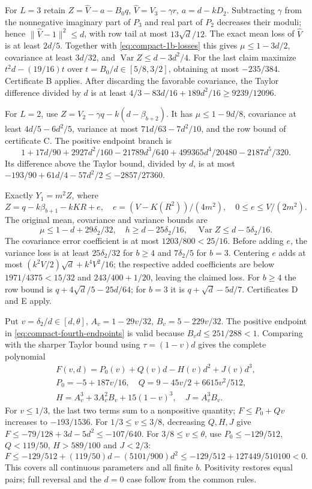 For $L=3$ retain $Z=\widehat V-a-B_0q$,
$\widehat V=V_3-\gamma r$, $a=d-kD_2$.
Subtracting $\gamma$ from the nonnegative imaginary part of $P_3$
and real part of $P_2$ decreases their moduli; hence
$\|\widehat V-1\|^2\le d$, with row tail at most $13\sqrt d/12$.
The exact mean loss of $\widehat V$ is at least $2d/5$.
Together with \eqref{eq:compact-1b-losses} this gives
$\mu\le1-3d/2$, covariance at least $3d/32$, and
$\operatorname{Var}Z\le d-3d^2/4$.
For the last claim maximize $t^2d-(19/16)t$ over
$t=B_0/d\in[5/8,3/2]$, obtaining at most $-235/384$.
Certificate B applies. After discarding the favorable covariance,
the Taylor difference divided by $d$ is at least
$4/3-83d/16+189d^2/16\ge9239/12096$.

For $L=2$, use $Z=V_2-\gamma q-k(d-\beta_{b+2})$.
It has $\mu\le1-9d/8$, covariance at least $4d/5-6d^2/5$,
variance at most $71d/63-7d^2/10$, and the row bound of certificate C.
The positive endpoint branch is
\[
 1+17d/90+2927d^2/160-21789d^3/640
                  +499365d^4/20480-2187d^5/320.
\]
Its difference above the Taylor bound, divided by $d$, is at most
$-193/90+61d/4-57d^2/2\le-2857/27360$.

Exactly $Y_1=m^2Z$, where
\[
 Z=q-k\beta_{b+1}-kKR+e,\quad
 e=(V-K(R^2))/(4m^2),\quad0\le e\le V/(2m^2).
\]
The original mean, covariance and variance bounds are
\[
 \mu\le1-d+29\delta_{2}/32,\quad h\ge d-25\delta_{2}/16,\quad
 \operatorname{Var}Z\le d-5\delta_{2}/16.
\]
The covariance error coefficient is at most $1203/800<25/16$.
Before adding $e$, the variance loss is at least $25\delta_{2}/32$ for
$b\ge4$ and $7\delta_{2}/5$ for $b=3$.
Centering $e$ adds at most $(k^2V/2)\sqrt d+k^4V^2/16$;
the respective added coefficients are below $1971/4375<15/32$ and
$243/400+1/20$, leaving the claimed loss.
For $b\ge4$ the row bound is $q+4\sqrt d/5-25d/64$;
for $b=3$ it is $q+\sqrt d-5d/7$. Certificates D and E apply.

Put $v=\delta_{2}/d\in[d,\theta]$,
$A_v=1-29v/32$, $B_v=5-229v/32$.
The positive endpoint in \eqref{eq:compact-fourth-endpoints} is valid
because $B_vd\le251/288<1$. Comparing with the sharper Taylor bound
using $\tau=(1-v)d$ gives the complete polynomial
\begin{gather*}
 F(v,d)=P_0(v)+Q(v)d-H(v)d^2+J(v)d^3,\\
 P_0=-5+187v/16,\quad Q=9-45v/2+6615v^2/512,\\
 H=A_v^3+3A_v^2B_v+15(1-v)^3,\quad J=A_v^3B_v.
\end{gather*}
For $v\le1/3$, the last two terms sum to a nonpositive quantity;
$F\le P_0+Qv$ increases to $-193/1536$.
For $1/3\le v\le3/8$, decreasing $Q,H,J$ give
$F\le-79/128+3d-5d^2\le-107/640$.
For $3/8\le v\le\theta$, use
$P_0\le-129/512$, $Q<119/50$, $H>589/100$ and $J<2/3$:
\[
 F\le-129/512+(119/50)d-(5101/900)d^2
 \le-129/512+127449/510100<0.
\]
This covers all continuous parameters and all finite $b$.
Positivity restores equal pairs; full reversal and the $d=0$ case
follow from the common rules.
